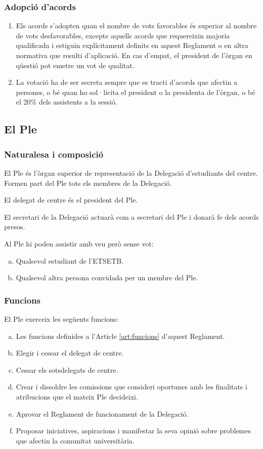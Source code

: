 \documentclass[a4paper,12pt]{article}
\renewcommand*{\thesubsubsection}{\arabic{subsubsection}}
\begin{document}
\subsubsection{Adopció d'acords}\label{art:acords}
\begin{enumerate}[\thesubsubsection.1]
	\item Els acords s'adopten quan el nombre de vots favorables és superior al nombre de vots desfavorables, excepte aquells acords que requereixin majoria qualificada i estiguin explícitament definits en aquest Reglament o en altra normativa que resulti d'aplicació. En cas d'empat, el president de l'òrgan en qüestió pot emetre un vot de qualitat.
	\item La votació ha de ser secreta sempre que es tracti d'acords que afectin a persones, o bé quan ho sol·licita el president o la presidenta de l'òrgan, o bé el 20\% dels assistents a la sessió.
\end{enumerate}

\subsection{El Ple}
\subsubsection{Naturalesa i composició}
El Ple és l'òrgan superior de representació de la Delegació d'estudiants del centre. Formen part del Ple tots els membres de la Delegació.

El delegat de centre és el president del Ple.

El secretari de la Delegació actuarà com a secretari del Ple i donarà fe dels acords presos.

Al Ple hi poden assistir amb veu però sense vot:
\begin{enumerate}[a)]
	\item Qualsevol estudiant de l'ETSETB.
	\item Qualsevol altra persona convidada per un membre del Ple.
\end{enumerate}

\subsubsection{Funcions}
El Ple exerceix les següents funcions:
\begin{enumerate}[a)]
	\item Les funcions definides a l'Article \ref{art:funcions} d'aquest Reglament.
	\item Elegir i cessar el delegat de centre.
	\item Cessar els sotsdelegats de centre.
	\item Crear i dissoldre les comissions que consideri oportunes amb les finalitats i atribucions que el mateix Ple decideixi.
	\item Aprovar el Reglament de funcionament de la Delegació.
	\item Proposar iniciatives, aspiracions i manifestar la seva opinió sobre problemes que afectin la comunitat universitària.
\end{enumerate}
\end{document}
